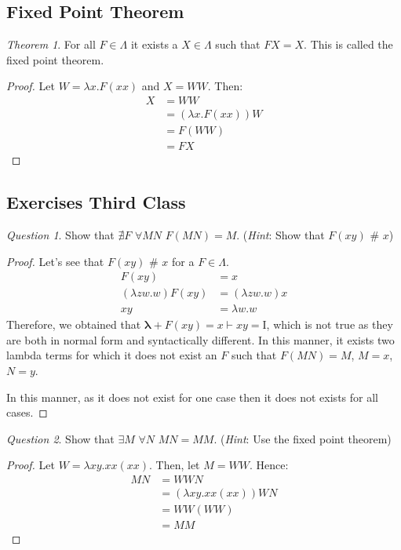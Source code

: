 \documentclass[11pt]{article}
\theoremstyle{definition}
\theoremstyle{remark}
\theoremstyle{remark}
\newtheorem{question}{Question}
\newtheorem{theorem}{Theorem}[section]
\theoremstyle{definition}
\newcommand{\dneq}{\,\, \# \,\,}
\newcommand{\I}{\pmb{\mathrm{I}}}
\begin{document}
\subsection{Fixed Point Theorem}
\begin{theorem}
  For all $F \in \Lambda$ it exists a $X \in \Lambda$ such that $FX = X$. This
  is called the fixed point theorem.
\end{theorem}
\begin{proof}
  Let $W = \lambda x. F(xx)$ and $X = WW$. Then:
  \begin{align*}
    X &= WW \\
      &= (\lambda x. F(xx))W \\
      &= F(WW) \\
      &= FX
  \end{align*}
\end{proof}

\subsection{Exercises Third Class}
\begin{question}
  \label{q:blackbox}
  Show that $\nexists F \,\,\forall MN \,\,F(MN) = M$. (\textit{Hint}: Show that
  $F(xy) \dneq x$)
\end{question}
\begin{proof}
  Let's see that $F(xy) \dneq x$ for a $F \in \Lambda$.
  \begin{align*}
    F(xy) &= x \\
    (\lambda zw. w) F(xy) &= (\lambda zw. w) x\\
    xy &= \lambda w.w
  \end{align*}
  Therefore, we obtained that $\pmb{\lambda} + F(xy)=x \vdash xy = \I$, which is
  not true as they are both in normal form and syntactically different. In this
  manner, it exists two lambda terms for which it does not exist an $F$ such
  that $F(MN) = M$, $M = x$, $N = y$.

  In this manner, as it does not exist for one case then it does not exists for
  all cases.
\end{proof}

\begin{question}
  Show that $\exists M \,\, \forall N \,\, MN = MM$. (\textit{Hint}: Use the
  fixed point theorem)
\end{question}
\begin{proof}
  Let $W=\lambda xy. xx(xx)$. Then, let $M = WW$. Hence:
  \begin{align*}
    MN &= WWN \\
       &= (\lambda xy. xx(xx))WN \\
       &= WW(WW) \\
       &= MM
  \end{align*}
\end{proof}
\end{document}
